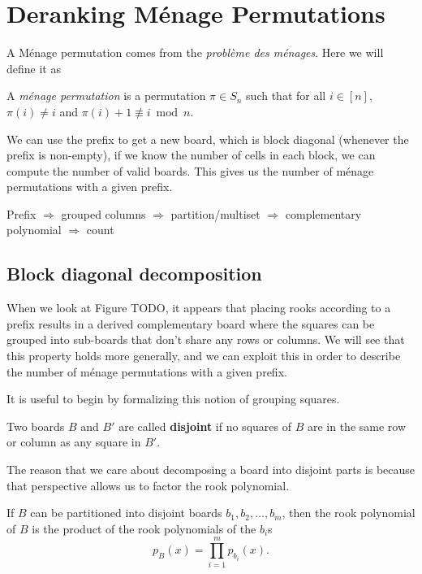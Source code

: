 \section{Deranking M\'enage Permutations}
A M\'enage permutation comes from the \textit{problème des ménages}. %
Here we will define it as
\begin{definition}
  A \textit{m\'enage permutation} is a permutation $\pi \in S_n$ such that for
  all $i \in [n]$,
  $\pi(i) \neq i$ and
  $\pi(i) + 1 \not\equiv i \bmod n$.
\end{definition}

We can use the prefix to get a new board, which is block diagonal
(whenever the prefix is non-empty), if we know the number of cells in each
block, we can compute the number of valid boards. This gives us the number of
m\'enage permutations with a given prefix.

Prefix $\Rightarrow$ grouped columns $\Rightarrow$ partition/multiset $\Rightarrow$ complementary polynomial $\Rightarrow$ count

\subsection{Block diagonal decomposition}
When we look at Figure TODO, it appears that placing rooks according to a prefix
results in a derived complementary board where the squares can be grouped into
sub-boards that don't share any rows or columns. We will see that this property
holds more generally, and we can exploit this in order to describe the number
of m\'enage permutations with a given prefix.

It is useful to begin by formalizing this notion of grouping squares.
\begin{definition}
  Two boards $B$ and $B'$ are called \textbf{disjoint} if no squares of $B$ are
  in the same row or column as any square in $B'$.
\end{definition}

The reason that we care about decomposing a board into disjoint parts
is because that perspective allows us to factor the rook polynomial.
\begin{lemma}
  If $B$ can be partitioned into disjoint boards $b_1, b_2, \dots, b_m$,
  then the rook polynomial of $B$ is the product of the rook polynomials of
  the $b_i$s \[
    p_B(x) = \prod_{i=1}^m p_{b_i}(x).
  \]
\end{lemma}

